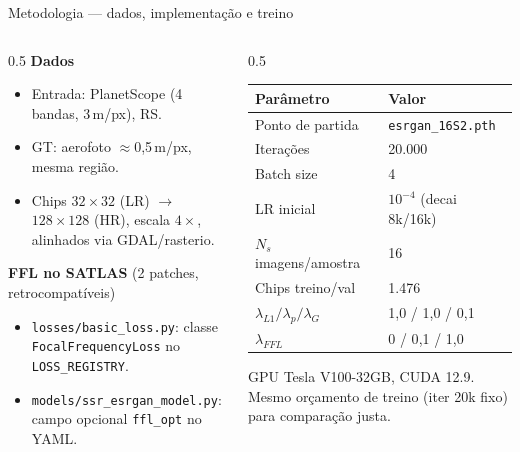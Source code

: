 \documentclass[aspectratio=169]{beamer}
\begin{document}
\begin{frame}{Metodologia --- dados, implementação e treino}

  \begin{columns}[T]
    \begin{column}{0.5\textwidth}
      \textbf{Dados}
      \begin{itemize}\small
        \item Entrada: PlanetScope (4 bandas, 3\,m/px), RS.
        \item GT: aerofoto $\approx$0{,}5\,m/px, mesma região.
        \item Chips $32\!\times\!32$ (LR) $\to$ $128\!\times\!128$ (HR),
              escala $4\times$, alinhados via GDAL/rasterio.
      \end{itemize}

      \vspace{0.3em}
      \textbf{FFL no SATLAS} (2 patches, retrocompatíveis)
      \begin{itemize}\small
        \item \texttt{losses/basic\_loss.py}: classe
              \texttt{FocalFrequencyLoss} no \texttt{LOSS\_REGISTRY}.
        \item \texttt{models/ssr\_esrgan\_model.py}: campo
              opcional \texttt{ffl\_opt} no YAML.
      \end{itemize}
    \end{column}
    \begin{column}{0.5\textwidth}
      \fontsize{8.5pt}{11pt}\selectfont
      \begin{tabular}{ll}
        \toprule
        \textbf{Parâmetro} & \textbf{Valor} \\
        \midrule
        Ponto de partida   & \texttt{esrgan\_16S2.pth} \\
        Iterações          & 20.000 \\
        Batch size         & 4 \\
        LR inicial         & $10^{-4}$ (decai 8k/16k) \\
        $N_s$ imagens/amostra & 16 \\
        Chips treino/val   & 1.476 \\
        $\lambda_{L1}/\lambda_{p}/\lambda_{G}$ & 1{,}0 / 1{,}0 / 0{,}1 \\
        $\lambda_{FFL}$    & 0 / 0{,}1 / 1{,}0 \\
        \bottomrule
      \end{tabular}

      \vspace{0.5em}
      {\small GPU Tesla V100-32GB, CUDA 12.9. Mesmo orçamento de treino
      (iter 20k fixo) para comparação justa.}
    \end{column}
  \end{columns}

\end{frame}
\end{document}
